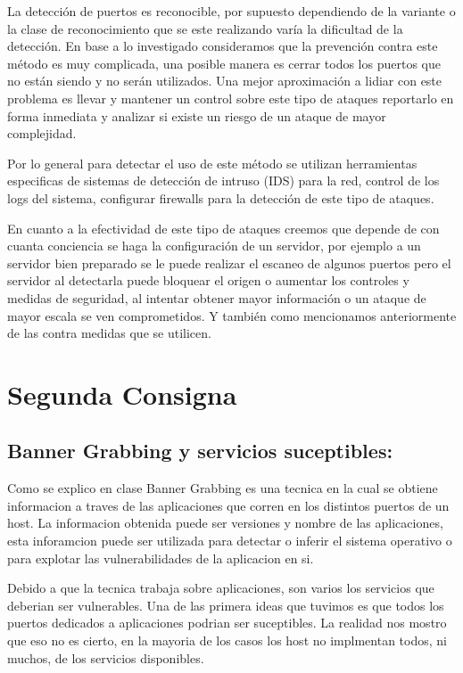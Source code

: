 \documentclass[a4paper]{article}
\begin{document}
La detección de puertos es reconocible, por supuesto dependiendo de la variante o la clase de reconocimiento que se este realizando varía la dificultad de la detección. En base a lo investigado 
consideramos que la prevención contra este método es muy complicada, una posible manera es cerrar todos los puertos que no están siendo y no serán utilizados. Una mejor aproximación a lidiar con este
problema es llevar y mantener un control sobre este tipo de ataques reportarlo en forma inmediata y analizar si existe un riesgo de un ataque de mayor complejidad.

Por lo general para detectar el uso de este método se utilizan herramientas especificas de sistemas de detección de intruso (IDS) para la red, control de los logs del sistema, configurar firewalls para la
detección de este tipo de ataques.

En cuanto a la efectividad de este tipo de ataques creemos que depende de con cuanta conciencia se haga la configuración de  un servidor, por ejemplo a un servidor bien preparado se le puede realizar
el escaneo de algunos puertos pero el servidor al detectarla puede bloquear el origen o aumentar los controles y medidas de seguridad, al intentar obtener mayor información o un ataque de mayor escala se ven
comprometidos. Y también como mencionamos anteriormente de las contra medidas que se utilicen.


\newpage
\section{Segunda Consigna}

\subsection{Banner Grabbing y servicios suceptibles:}
Como se explico en clase  Banner Grabbing es una tecnica en la cual se obtiene informacion a traves de las aplicaciones que corren en los distintos puertos de un host. La informacion obtenida puede ser
versiones y nombre de las aplicaciones, esta inforamcion puede ser utilizada para detectar o inferir el sistema operativo o para explotar las vulnerabilidades de la aplicacion en si.

Debido a que la tecnica trabaja sobre aplicaciones, son varios los servicios que deberian ser vulnerables. Una de las primera ideas que tuvimos es que todos los puertos dedicados a aplicaciones
podrian ser suceptibles. La realidad nos mostro que eso no es cierto, en la mayoria de los casos los host no implmentan todos, ni muchos, de los servicios disponibles. 
\end{document}
